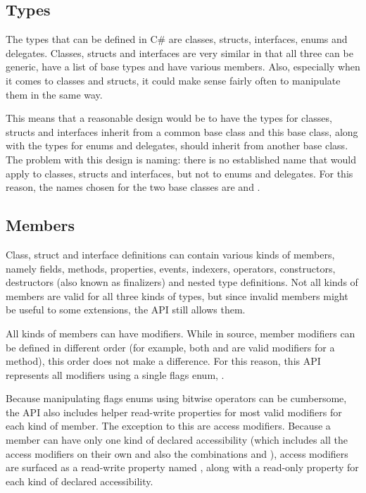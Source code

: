 \subsection{Types}

The types that can be defined in C\# are classes, structs, interfaces, enums and delegates. Classes, structs and interfaces are very similar in that all three can be generic, have a list of base types and have various members. Also, especially when it comes to classes and structs, it could make sense fairly often to manipulate them in the same way. 

This means that a reasonable design would be to have the types for classes, structs and interfaces inherit from a common base class and this base class, along with the types for enums and delegates, should inherit from another base class. The problem with this design is naming: there is no established name that would apply to classes, structs and interfaces, but not to enums and delegates. For this reason, the names chosen for the two base classes are  and .



\subsection{Members}

Class, struct and interface definitions can contain various kinds of members, namely fields, methods, properties, events, indexers, operators, constructors, destructors (also known as finalizers) and nested type definitions. Not all kinds of members are valid for all three kinds of types, but since invalid members might be useful to some extensions, the \ac{API} still allows them.

All kinds of members can have modifiers. While in source, member modifiers can be defined in different order (for example, both  and  are valid modifiers for a method), this order does not make a difference. For this reason, this \ac{API} represents all modifiers using a single flags enum, . 

Because manipulating flags enums using bitwise operators can be cumbersome, the \ac{API} also includes helper read-write properties for most valid modifiers for each kind of member. The exception to this are access modifiers. Because a member can have only one kind of declared accessibility (which includes all the access modifiers on their own and also the combinations  and ), access modifiers are surfaced as a read-write property named , along with a read-only property for each kind of declared accessibility.

